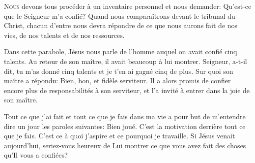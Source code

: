 


\lettrine{N}{ous} devons tous procéder à un inventaire personnel
 et nous demander: 
 \Og Qu'est-ce que le Seigneur m'a confié? \Fg{}
 Quand nous comparaîtrons devant le tribunal du Christ,
 chacun d'entre nous devra répondre de ce que nous aurons fait de nos vies,
 de nos talents et de nos ressources. 


Dans cette parabole, Jésus nous parle de l'homme auquel on avait confié
 cinq talents. Au retour de son maître, il avait beaucoup à lui montrer.
 \Og Seigneur, a-t-il dit, 
 tu m'as donné cinq talents et je t'en ai gagné cinq de plus. \Fg{}
 Sur quoi son maître a répondu: 
 \Og Bien, bon, et fidèle serviteur. \Fg{}
 Il a alors promis de confier encore plus de responsabilités à son serviteur,
 et l'a invité à entrer dans \Og la joie de son maître. \Fg{}

Tout ce que j'ai fait et tout ce que je fais dans ma vie
 a pour but de m'entendre dire un jour les paroles suivantes: 
 \Og Bien joué. \Fg{} 
 C'est la motivation derrière tout ce que je fais.
 C'est ce à quoi j'aspire et ce pourquoi je travaille.
 Si Jésus venait aujourd'hui, seriez-vous heureux de Lui montrer
 ce que vous avez fait des choses qu'Il vous a confiées? 

\dvrule






